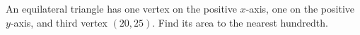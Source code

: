 An equilateral triangle has one vertex on the positive $x$-axis, one on the positive $y$-axis, and third vertex $(20,25)$. Find its area to the nearest hundredth.
